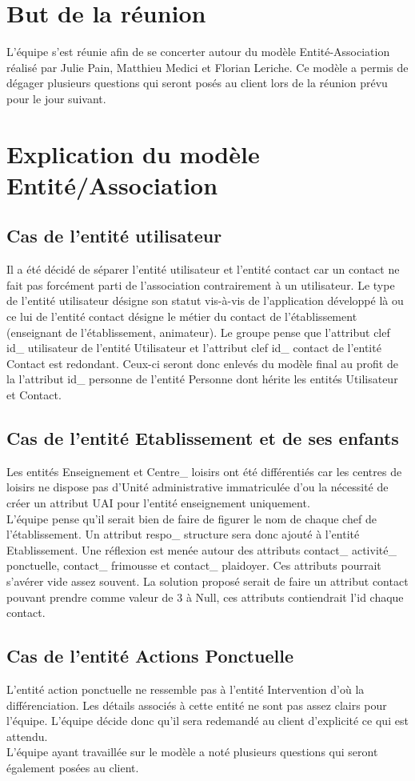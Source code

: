 \documentclass [a4paper] {article}
\begin{document}
\section{But de la réunion}
L'équipe s'est réunie afin de se concerter autour du modèle Entité-Association réalisé par Julie Pain, Matthieu Medici et Florian Leriche. Ce modèle a permis de dégager plusieurs questions qui seront posés au client lors de la réunion prévu pour le jour suivant.

\section{Explication du modèle Entité/Association}

\subsection{Cas de l'entité utilisateur}
Il a été décidé de séparer l'entité utilisateur et l'entité contact car un contact ne fait pas forcément parti de l'association contrairement à un utilisateur.
Le type de l'entité utilisateur désigne son statut vis-à-vis de l'application développé là ou ce lui de l'entité contact désigne le métier du contact de l'établissement (enseignant de l'établissement, animateur).
Le groupe pense que l'attribut clef id\_ utilisateur de l'entité Utilisateur et l'attribut clef id\_ contact de l'entité Contact est redondant. Ceux-ci seront donc enlevés du modèle final au profit de la l'attribut id\_ personne de l'entité Personne dont hérite les entités Utilisateur et Contact.

\subsection{Cas de l'entité Etablissement et de ses enfants}
Les entités Enseignement et Centre\_ loisirs ont été différentiés car les centres de loisirs ne dispose pas d'Unité administrative immatriculée d'ou la nécessité de créer un attribut UAI pour l'entité enseignement uniquement.
\\
L'équipe pense qu'il serait bien de faire de figurer le nom de chaque chef de l'établissement. Un attribut respo\_ structure sera donc ajouté à l'entité Etablissement.
Une réflexion est menée autour des attributs contact\_ activité\_ ponctuelle, contact\_ frimousse et contact\_ plaidoyer. Ces attributs pourrait s'avérer vide assez souvent. La solution proposé serait de faire un attribut contact pouvant prendre comme valeur de 3 à Null, ces attributs contiendrait l'id chaque contact.

\subsection{Cas de l'entité Actions Ponctuelle}
L'entité action ponctuelle ne ressemble pas à l'entité Intervention d'où la différenciation. Les détails associés à cette entité ne sont pas assez clairs pour l'équipe. L'équipe décide donc qu'il sera redemandé au client d'explicité ce qui est attendu.
\\
L'équipe ayant travaillée sur le modèle a noté plusieurs questions qui seront également posées au client. 


\end{document}
